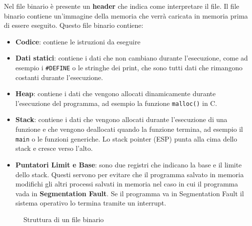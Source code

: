 \documentclass[a4paper]{article}
\theoremstyle{break}
\theoremstyle{break}
\theoremstyle{break}
\theoremstyle{break}
\begin{document}
\vspace{1em}
Nel file binario è presente un \textbf{header} che indica come interpretare il file.
Il file binario contiene un'immagine della memoria che verrà caricata in memoria
prima di essere eseguito. Questo file binario contiene:
\begin{itemize}
	\item \textbf{Codice}: contiene le istruzioni da eseguire
	\item \textbf{Dati statici}: contiene i dati che non cambiano durante l'esecuzione,
	      come ad esempio i \texttt{\#DEFINE} o le stringhe dei print, che sono tutti dati
	      che rimangono costanti durante l'esecuzione.
	\item \textbf{Heap}: contiene i dati che vengono allocati dinamicamente durante
	      l'esecuzione del programma, ad esempio la funzione \texttt{malloc()} in C.
	\item \textbf{Stack}: contiene i dati che vengono allocati durante l'esecuzione
	      di una funzione e che vengono deallocati quando la funzione termina, ad
	      esempio il \texttt{main} o le funzioni generiche. Lo stack pointer (ESP)
	      punta alla cima dello stack e cresce verso l'alto.
	\item \textbf{Puntatori Limit e Base}: sono due registri che indicano la base
	      e il limite dello stack. Questi servono per evitare che il programma salvato in
	      memoria modifichi gli altri processi salvati in memoria nel caso in cui il
	      programma vada in \textbf{Segmentation Fault}. Se il programma va in Segmentation
	      Fault il sistema operativo lo termina tramite un interrupt.
\end{itemize}

\begin{figure}[H]
	\centering
	\caption{Struttura di un file binario}
\end{figure}
\end{document}
